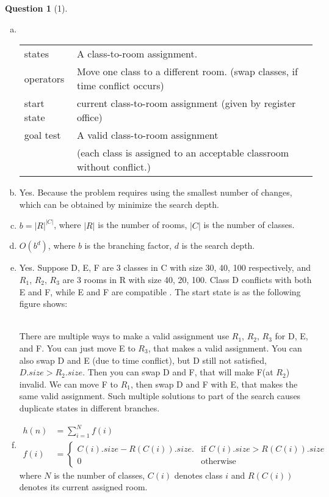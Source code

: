 \documentclass{article}
\theoremstyle{quest}
\newtheorem*{question}{Question}
\begin{document}
\begin{question}[1]
\end{question}
\begin{enumerate}[a.]
\item
~\\
\begin{tabular}{ll}
states & A class-to-room assignment.\\
operators & Move one class to a different room. (swap classes, if time conflict occurs)\\
start state & current class-to-room assignment (given by register office)\\ 
goal test & A valid class-to-room assignment \\
& (each class is assigned to an acceptable classroom without conflict.)
\end{tabular}
\item
Yes. Because the problem requires using the smallest number of changes, which can be obtained by minimize the search depth.
\item
$b = |R|^{|C|}$, where $|R|$ is the number of rooms, $|C|$ is the number of classes. 
\item
$O(b^d)$, where $b$ is the branching factor, $d$ is the search depth. 
\item
Yes. Suppose D, E, F are 3 classes in C with size 30, 40, 100 respectively, and $R_1$, $R_2$, $R_3$ are 3 rooms in R with size 40, 20, 100. Class D conflicts with both E and F, while E and F are compatible . The start state is as the following figure shows: \\
~\\

There are multiple ways to make a valid assignment use $R_1$, $R_2$, $R_3$ for D, E, and F. You can just move E to $R_3$, that makes a valid assignment. You can also swap D and E (due to time conflict), but D still not satisfied, $D.size >R_2.size$. Then you can swap D and F, that will make F(at $R_2$) invalid. We can move F to $R_1$, then swap D and F with E, that makes the same valid assignment.  Such multiple solutions to part of the search causes duplicate states in different branches.
\item
\begin{align}
h(n) &= \sum\limits_{i=1}^{N} f(i) \\
f(i) &=
\begin{cases}
C(i).size - R(C(i)).size. &  \text{if } C(i).size > R(C(i)).size\\
 0   & \text{otherwise}
\end{cases}
\end{align}
where $N$ is the number of classes, $C(i)$ denotes class $i$ and $R(C(i))$ denotes its current assigned room.


\end{enumerate}
\end{document}
